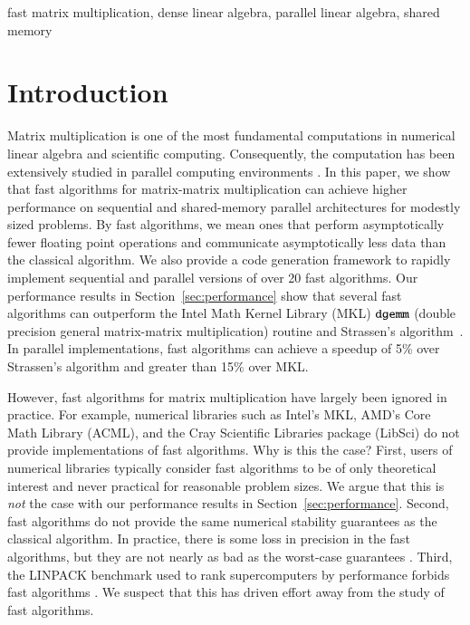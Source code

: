 \documentclass[preprint]{sigplanconf}
\begin{document}



\keywords
fast matrix multiplication, dense linear algebra, parallel linear algebra, shared memory

\section{Introduction}

Matrix multiplication is one of the most fundamental computations in numerical linear algebra and scientific computing.
Consequently, the computation has been extensively studied in parallel computing environments \cite{van1997summa, solomonik2011communication, irony2004communication, ballard2012communication, volkov2008benchmarking}.
In this paper, we show that fast algorithms for matrix-matrix multiplication can achieve higher performance on sequential and shared-memory parallel architectures for modestly sized problems.
By fast algorithms, we mean ones that perform asymptotically fewer floating point operations and communicate asymptotically less data than the classical algorithm.
We also provide a code generation framework to rapidly implement sequential and parallel versions of over 20 fast algorithms.
Our performance results in Section~\ref{sec:performance} show that several fast algorithms can outperform the Intel Math Kernel Library (MKL) $\texttt{dgemm}$ (double precision general matrix-matrix multiplication) routine and Strassen's algorithm~\cite{strassen1969gaussian}.
In parallel implementations, fast algorithms can achieve a speedup of 5\% over Strassen's algorithm and greater than 15\% over MKL.

However, fast algorithms for matrix multiplication have largely been ignored in practice.
For example, numerical libraries such as Intel's MKL, AMD's Core Math Library (ACML),
and the Cray Scientific Libraries package (LibSci) do not provide implementations of fast algorithms.
Why is this the case?
First, users of numerical libraries typically consider fast algorithms to be of only theoretical interest and never practical for reasonable problem sizes.
We argue that this is \emph{not} the case with our performance results in Section~\ref{sec:performance}.
Second, fast algorithms do not provide the same numerical stability guarantees as the classical algorithm.
In practice, there is some loss in precision in the fast algorithms, but they are not nearly as bad as the worst-case guarantees \cite{higham2002accuracy,lipshitz2012communication}.
Third, the LINPACK benchmark used to rank supercomputers by performance forbids fast algorithms \cite{TOP500}.
We suspect that this has driven effort away from the study of fast algorithms.
\end{document}
